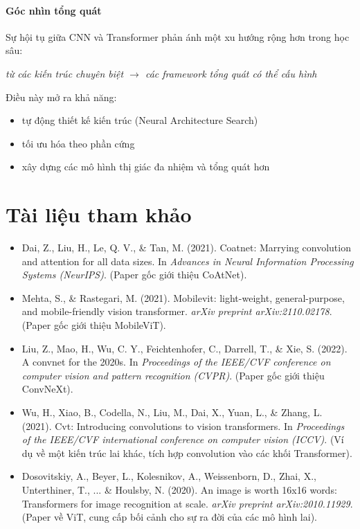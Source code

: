 \paragraph{Góc nhìn tổng quát}

Sự hội tụ giữa CNN và Transformer phản ánh một xu hướng rộng hơn trong học sâu:
\begin{center}
	\textit{từ các kiến trúc chuyên biệt $\rightarrow$ các framework tổng quát có thể cấu hình}
\end{center}

Điều này mở ra khả năng:
\begin{itemize}
	\item tự động thiết kế kiến trúc (Neural Architecture Search)
	\item tối ưu hóa theo phần cứng
	\item xây dựng các mô hình thị giác đa nhiệm và tổng quát hơn
\end{itemize}

\section*{Tài liệu tham khảo}
\begin{itemize}
	\item[1] Dai, Z., Liu, H., Le, Q. V., \& Tan, M. (2021). Coatnet: Marrying convolution and attention for all data sizes. In \textit{Advances in Neural Information Processing Systems (NeurIPS)}. (Paper gốc giới thiệu CoAtNet).
	\item[2] Mehta, S., \& Rastegari, M. (2021). Mobilevit: light-weight, general-purpose, and mobile-friendly vision transformer. \textit{arXiv preprint arXiv:2110.02178}. (Paper gốc giới thiệu MobileViT).
	\item[3] Liu, Z., Mao, H., Wu, C. Y., Feichtenhofer, C., Darrell, T., \& Xie, S. (2022). A convnet for the 2020s. In \textit{Proceedings of the IEEE/CVF conference on computer vision and pattern recognition (CVPR)}. (Paper gốc giới thiệu ConvNeXt).
	\item[4] Wu, H., Xiao, B., Codella, N., Liu, M., Dai, X., Yuan, L., \& Zhang, L. (2021). Cvt: Introducing convolutions to vision transformers. In \textit{Proceedings of the IEEE/CVF international conference on computer vision (ICCV)}. (Ví dụ về một kiến trúc lai khác, tích hợp convolution vào các khối Transformer).
	\item[5] Dosovitskiy, A., Beyer, L., Kolesnikov, A., Weissenborn, D., Zhai, X., Unterthiner, T., ... \& Houlsby, N. (2020). An image is worth 16x16 words: Transformers for image recognition at scale. \textit{arXiv preprint arXiv:2010.11929}. (Paper về ViT, cung cấp bối cảnh cho sự ra đời của các mô hình lai).
\end{itemize}